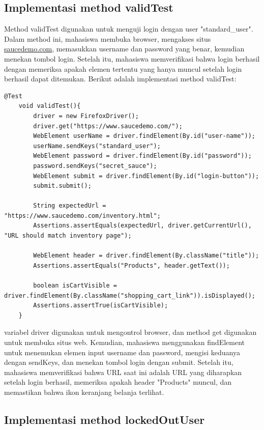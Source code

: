 \documentclass[a4paper,12pt]{article}
\begin{document}
\subsection{Implementasi method validTest}

Method validTest digunakan untuk menguji login dengan user "standard\_user". Dalam method ini, mahasiswa membuka browser, mengakses situs \url{saucedemo.com}, memasukkan username dan password yang benar, kemudian menekan tombol login. Setelah itu, mahasiswa memverifikasi bahwa login berhasil dengan memeriksa apakah elemen tertentu yang hanya muncul setelah login berhasil dapat ditemukan. Berikut adalah implementasi method validTest:

\begin{lstlisting}[style=javastyle]
@Test
    void validTest(){
        driver = new FirefoxDriver();
        driver.get("https://www.saucedemo.com/");
        WebElement userName = driver.findElement(By.id("user-name"));
        userName.sendKeys("standard_user");
        WebElement password = driver.findElement(By.id("password"));
        password.sendKeys("secret_sauce");
        WebElement submit = driver.findElement(By.id("login-button"));
        submit.submit();

        String expectedUrl = "https://www.saucedemo.com/inventory.html";
        Assertions.assertEquals(expectedUrl, driver.getCurrentUrl(), "URL should match inventory page");

        WebElement header = driver.findElement(By.className("title"));
        Assertions.assertEquals("Products", header.getText());

        boolean isCartVisible = driver.findElement(By.className("shopping_cart_link")).isDisplayed();
        Assertions.assertTrue(isCartVisible);
    }
\end{lstlisting}

variabel driver digunakan untuk mengontrol browser, dan method get digunakan untuk membuka situs web. Kemudian, mahasiswa menggunakan findElement untuk menemukan elemen input username dan password, mengisi keduanya dengan sendKeys, dan menekan tombol login dengan submit. Setelah itu, mahasiswa memverifikasi bahwa URL saat ini adalah URL yang diharapkan setelah login berhasil, memeriksa apakah header "Products" muncul, dan memastikan bahwa ikon keranjang belanja terlihat.

\subsection{Implementasi method lockedOutUser}
\end{document}
